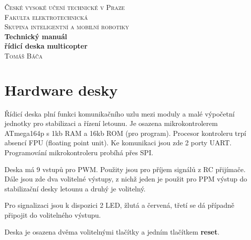 \documentclass[11pt, a4paper]{article}
\newcommand{\Author}{Tomáš Báča}
\begin{document}
\begin{titlepage}

\begin{center}

\textsc{\LARGE České vysoké učení technické v Praze }\\[1.0cm]
\textsc{\LARGE Fakulta elektrotechnická }\\[1.0cm]
\textsc{\large Skupina inteligentní a mobilní robotiky }\\[0.5cm]

{ \huge \bfseries Technický manuál\\[0.5cm] řídicí deska multicopter }\\[1.0cm]

\large
\textsc{\Author}

\vfill

\end{center}

\end{titlepage}

\newpage

\tableofcontents

\newpage

\setlength{\parskip}{0.35cm}
\lhead{\emph{\leftmark}}
\rhead{}
\cfoot{}
\rfoot{\thepage$/$\pageref{LastPage}}

\section{Hardware desky}

Řídicí deska plní funkci komunikačního uzlu mezi moduly a malé výpočetní jednotky pro stabilizaci a řízení letounu. Je osazena mikrokontrolerem ATmega164p s 1kb RAM a 16kb ROM (pro program). Procesor kontroleru trpí absencí FPU (floating point unit). Ke komunikaci jsou zde 2 porty UART. Programování mikrokontroleru probíhá přes SPI.

Deska má 9 vstupů pro PWM. Použity jsou pro příjem signálů z RC přijímače. Dále jsou zde dva volitelné výstupy, z nichž jeden je použit pro PPM výstup do stabilizační desky letounu a druhý je volitelný.

Pro signalizaci jsou k dispozici 2 LED, žlutá a červená, třetí se dá případně připojit do volitelného výstupu.

Deska je osazena dvěma volitelnými tlačítky a jedním tlačítkem \textbf{reset}.
\end{document}
